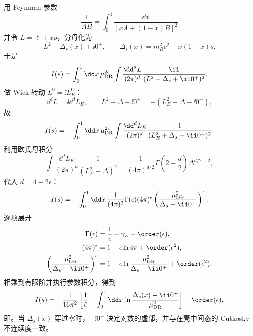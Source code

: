 \begin{derivation}[标量四次相互作用的一圈泡积分]
用 Feynman 参数
\begin{equation*}
 \frac1{AB}=\int_0^1\frac{\dd x}{[xA+(1-x)B]^2}
\end{equation*}
并令 \(L=\ell+xp\)，分母化为
\begin{equation*}
 L^2-\Delta_s(x)+\ii0^+,
 \qquad
 \Delta_s(x)=m_R^2c^2-x(1-x)s.
\end{equation*}
于是
\begin{equation*}
 I(s)=\int_0^1\dd x\,
 \mu_{\rm DR}^{2\epsilon}
 \int\frac{\dd^d L}{(2\pi)^d}
 \frac{\ii}{(L^2-\Delta_s+\ii0^+)^2}.
\end{equation*}
做 Wick 转动 \(L^0=\ii L_E^0\)：
\begin{equation*}
 \dd^d L=\ii\dd^d L_E,
 \qquad
 L^2-\Delta+\ii0^+=-(L_E^2+\Delta-\ii0^+),
\end{equation*}
故
\begin{equation*}
 I(s)=-\int_0^1\dd x\,
 \mu_{\rm DR}^{2\epsilon}
 \int\frac{\dd^d L_E}{(2\pi)^d}
 \frac1{(L_E^2+\Delta_s-\ii0^+)^2}.
\end{equation*}
利用欧氏母积分
\begin{equation*}
 \int\frac{\dd^d L_E}{(2\pi)^d}
 \frac1{(L_E^2+\Delta)^2}
 =\frac1{(4\pi)^{d/2}}
 \Gamma\!\left(2-\frac d2\right)
 \Delta^{d/2-2},
\end{equation*}
代入 \(d=4-2\epsilon\)：
\begin{equation*}
 I(s)=-\int_0^1\dd x\,
 \frac1{(4\pi)^2}
 \Gamma(\epsilon)(4\pi)^\epsilon
 \left(\frac{\mu_{\rm DR}^2}{\Delta_s-\ii0^+}\right)^\epsilon.
\end{equation*}
逐项展开
\begin{align*}
 \Gamma(\epsilon)&=\frac1\epsilon-\gamma_E+\order(\epsilon),\\
 (4\pi)^\epsilon&=1+\epsilon\ln4\pi+\order(\epsilon^2),\\
 \left(\frac{\mu_{\rm DR}^2}{\Delta_s-\ii0^+}\right)^\epsilon
 &=1+\epsilon\ln\frac{\mu_{\rm DR}^2}{\Delta_s-\ii0^+}
 +\order(\epsilon^2).
\end{align*}
相乘到有限阶并执行参数积分，得到
\begin{equation*}
 I(s)=-\frac1{16\pi^2}
 \left[
 \frac1{\bar\epsilon}
 -\int_0^1\dd x\,
 \ln\frac{\Delta_s(x)-\ii0^+}{\mu_{\rm DR}^2}
 \right]+
 \order(\epsilon),
\end{equation*}
即。当 \(\Delta_s(x)\) 穿过零时，\(-\ii0^+\) 决定对数的虚部，并与在壳中间态的 Cutkosky 不连续度一致。
\end{derivation}

